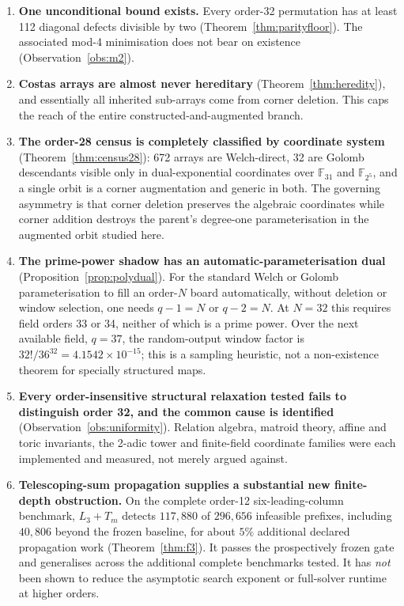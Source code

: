 \documentclass[11pt,a4paper]{article}
\theoremstyle{definition}
\newcommand{\F}{\mathbb{F}}
\begin{document}
\begin{enumerate}[label=\textbf{S\arabic*.},leftmargin=*]
\item \textbf{One unconditional bound exists.} Every order-32 permutation has at
least 112 diagonal defects divisible by two (Theorem~\ref{thm:parityfloor}). The
associated mod-4 minimisation does not bear on existence
(Observation~\ref{obs:m2}).

\item \textbf{Costas arrays are almost never hereditary}
(Theorem~\ref{thm:heredity}), and essentially all inherited sub-arrays come from
corner deletion. This caps the reach of the entire constructed-and-augmented
branch.

\item \textbf{The order-28 census is completely classified by coordinate
system} (Theorem~\ref{thm:census28}): 672 arrays are Welch-direct, 32 are Golomb
descendants visible only in dual-exponential coordinates over $\F_{31}$ and
$\F_{2^5}$, and a single orbit is a corner augmentation and generic in both. The
governing asymmetry is that corner deletion preserves the algebraic coordinates
while corner addition destroys the parent's degree-one parameterisation in the
augmented orbit studied here.

\item \textbf{The prime-power shadow has an automatic-parameterisation dual}
(Proposition~\ref{prop:polydual}). For the standard Welch or Golomb
parameterisation to fill an order-$N$ board automatically, without deletion or
window selection, one needs $q-1=N$ or $q-2=N$. At $N=32$ this requires field
orders 33 or 34, neither of which is a prime power. Over the next available
field, $q=37$, the random-output window factor is
$32!/36^{32}=4.1542\times10^{-15}$; this is a sampling heuristic, not a
non-existence theorem for specially structured maps.

\item \textbf{Every order-insensitive structural relaxation tested fails to
distinguish order 32, and the common cause
is identified} (Observation~\ref{obs:uniformity}). Relation algebra, matroid
theory, affine and toric invariants, the 2-adic tower and finite-field coordinate
families were each implemented and measured, not merely argued against.

\item \textbf{Telescoping-sum propagation supplies a substantial new
finite-depth obstruction.} On the complete order-12 six-leading-column benchmark,
$L_3+T_m$ detects $117{,}880$ of $296{,}656$ infeasible prefixes, including
$40{,}806$ beyond the frozen baseline, for about $5\%$ additional declared
propagation work (Theorem~\ref{thm:f3}). It passes the prospectively frozen gate
and generalises across the additional complete benchmarks tested. It has
\emph{not} been shown to reduce the asymptotic search exponent or full-solver
runtime at higher orders.


\end{enumerate}
\end{document}
